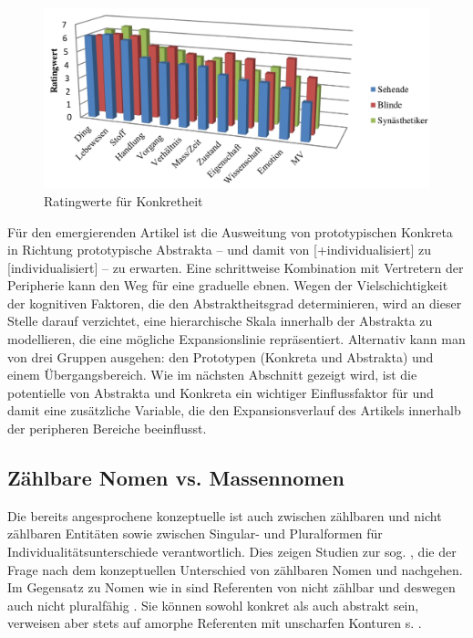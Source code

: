 \begin{figure}
\begin{center}
\includegraphics[width=12cm]{images/rating-konkret-abstrakt-schrauf-neu.jpg}
\caption {Ratingwerte für Konkretheit \parencite[Darstellung aus][162]{Schrauf2011}}
\label{abb:schrauf-rating}
\end{center}
\end{figure}

Für den emergierenden Artikel ist die Ausweitung von prototypischen  Konkreta in Richtung prototypische  Abstrakta -- und damit von [+individualisiert] zu [\textminus{}individualisiert] -- zu erwarten. Eine schrittweise Kombination mit Vertretern der Peripherie kann den Weg für eine graduelle  ebnen. Wegen der Vielschichtigkeit der kognitiven Faktoren, die den Abstraktheitsgrad determinieren, wird an dieser Stelle darauf verzichtet, eine hierarchische Skala innerhalb der  Abstrakta  zu modellieren, die eine mögliche Expansionslinie  repräsentiert. Alternativ kann man von drei Gruppen ausgehen: den Prototypen (Konkreta  und  Abstrakta) und einem Übergangsbereich. Wie im nächsten Abschnitt gezeigt wird, ist die potentielle  von Abstrakta  und Konkreta  ein wichtiger Einflussfaktor für   und damit eine zusätzliche Variable, die den Expansionsverlauf  des Artikels innerhalb der peripheren Bereiche beeinflusst.  

\subsection{Zählbare Nomen vs. Massennomen}\label{section:mass}

Die bereits angesprochene konzeptuelle  ist auch zwischen zählbaren und nicht zählbaren Entitäten sowie zwischen Singular- und Pluralformen  für Individualitätsunterschiede  verantwortlich. Dies zeigen Studien zur sog.   \parencite[s.][]{Jackendoff1991, Langacker1991, Bisle-Muller1991, Rijkhoff1991,Rijkhoff2002, Corbett2000, Massam2012,Zifonun2012}, die der Frage nach dem konzeptuellen Unterschied von zählbaren Nomen und  nachgehen. Im Gegensatz zu Nomen wie in  sind Referenten von  nicht zählbar und deswegen auch nicht pluralfähig  \parencite[77]{Langacker1991}. Sie können sowohl konkret  als auch abstrakt  sein, verweisen aber stets auf amorphe Referenten mit unscharfen Konturen s. . 

